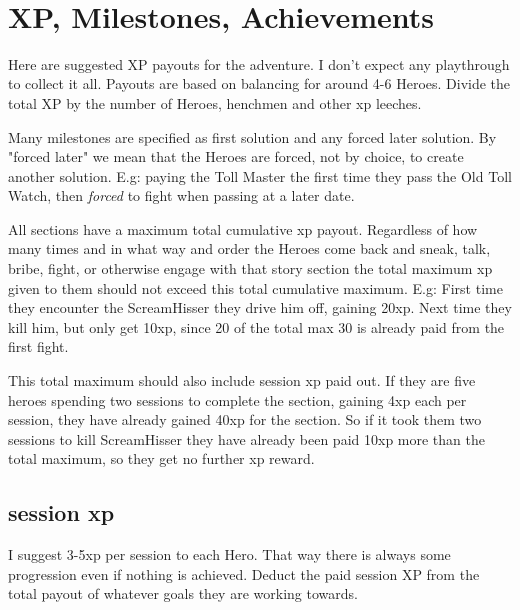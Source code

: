 \














\clearpage
{}
\section*{XP, Milestones, Achievements}

Here are suggested XP payouts for the adventure. I don't expect any playthrough to collect it all.
Payouts are based on balancing for around 4-6 Heroes. Divide the total XP by the number of Heroes, henchmen and other xp leeches.

Many milestones are specified as first solution and any forced later solution. By "forced later" we mean that the Heroes are forced, not by choice, to create another solution. E.g: paying the Toll Master the first time they pass the Old Toll Watch, then \emph{forced} to fight when passing at a later date.

All sections have a maximum total cumulative xp payout. Regardless of how many times and in what way and order the Heroes come back and sneak, talk, bribe, fight, or otherwise engage with that story section the total maximum xp given to them should not exceed this total cumulative maximum. E.g: First time they encounter the ScreamHisser they drive him off, gaining 20xp. Next time they kill him, but only get 10xp, since 20 of the total max 30 is already paid from the first fight.

This total maximum should also include session xp paid out. If they are five heroes spending two sessions to complete the section, gaining 4xp each per session, they have already gained 40xp for the section. So if it took them two sessions to kill ScreamHisser they have already been paid 10xp more than the total maximum, so they get no further xp reward.


\subsection*{session xp}
I suggest 3-5xp per session to each Hero. That way there is always some progression even if nothing is achieved. Deduct the paid session XP from the total payout of whatever goals they are working towards.


